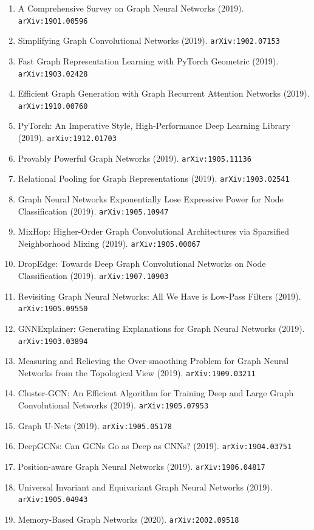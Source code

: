 \documentclass[11pt]{article}
\begin{document}
\begin{enumerate}
  \item A Comprehensive Survey on Graph Neural Networks (2019). \texttt{arXiv:1901.00596}
  \item Simplifying Graph Convolutional Networks (2019). \texttt{arXiv:1902.07153}
  \item Fast Graph Representation Learning with PyTorch Geometric (2019). \texttt{arXiv:1903.02428}
  \item Efficient Graph Generation with Graph Recurrent Attention Networks (2019). \texttt{arXiv:1910.00760}
  \item PyTorch: An Imperative Style, High-Performance Deep Learning Library (2019). \texttt{arXiv:1912.01703}
  \item Provably Powerful Graph Networks (2019). \texttt{arXiv:1905.11136}
  \item Relational Pooling for Graph Representations (2019). \texttt{arXiv:1903.02541}
  \item Graph Neural Networks Exponentially Lose Expressive Power for Node
  Classification (2019). \texttt{arXiv:1905.10947}
  \item MixHop: Higher-Order Graph Convolutional Architectures via Sparsified
  Neighborhood Mixing (2019). \texttt{arXiv:1905.00067}
  \item DropEdge: Towards Deep Graph Convolutional Networks on Node
  Classification (2019). \texttt{arXiv:1907.10903}
  \item Revisiting Graph Neural Networks: All We Have is Low-Pass Filters (2019). \texttt{arXiv:1905.09550}
  \item GNNExplainer: Generating Explanations for Graph Neural Networks (2019). \texttt{arXiv:1903.03894}
  \item Measuring and Relieving the Over-smoothing Problem for Graph Neural
  Networks from the Topological View (2019). \texttt{arXiv:1909.03211}
  \item Cluster-GCN: An Efficient Algorithm for Training Deep and Large Graph
  Convolutional Networks (2019). \texttt{arXiv:1905.07953}
  \item Graph U-Nets (2019). \texttt{arXiv:1905.05178}
  \item DeepGCNs: Can GCNs Go as Deep as CNNs? (2019). \texttt{arXiv:1904.03751}
  \item Position-aware Graph Neural Networks (2019). \texttt{arXiv:1906.04817}
  \item Universal Invariant and Equivariant Graph Neural Networks (2019). \texttt{arXiv:1905.04943}
  \item Memory-Based Graph Networks (2020). \texttt{arXiv:2002.09518}

\end{enumerate}
\end{document}

